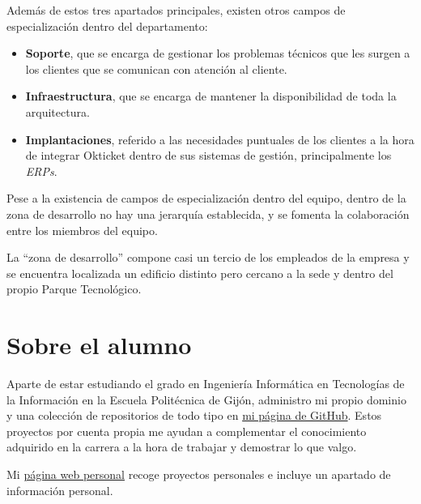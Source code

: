 \newpage{}
Además de estos tres apartados principales, existen otros campos de especialización
dentro del departamento:
\begin{itemize}
	\item \textbf{Soporte}, que se encarga de gestionar los problemas técnicos que les surgen a los
		clientes que se comunican con atención al cliente.
	\item \textbf{Infraestructura}, que se encarga de mantener la disponibilidad de toda la arquitectura.
	\item \textbf{Implantaciones}, referido a las necesidades puntuales de los clientes a la
		hora de integrar Okticket dentro de sus sistemas de gestión, principalmente los \textit{ERPs}.
\end{itemize}

Pese a la existencia de campos de especialización dentro del equipo, dentro de la zona de
desarrollo no hay una jerarquía establecida, y se fomenta la colaboración entre los miembros
del equipo.

La ``zona de desarrollo'' compone casi un tercio de los empleados de la empresa y se
encuentra localizada un edificio distinto pero cercano a la sede y dentro del propio Parque
Tecnológico.

\section{Sobre el alumno}
Aparte de estar estudiando el grado en Ingeniería Informática en Tecnologías de la Información
en la Escuela Politécnica de Gijón, administro mi propio dominio y una colección de
repositorios de todo tipo en \href{https://github.com/miermontoto}{mi página de GitHub}. Estos
proyectos por cuenta propia me ayudan a complementar el conocimiento adquirido en la carrera a la
hora de trabajar y demostrar lo que valgo.

Mi \href{\target}{página web personal} recoge proyectos personales e incluye un apartado de información
personal.
